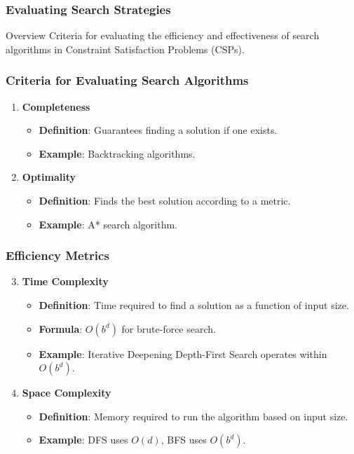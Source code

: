 \documentclass[aspectratio=169]{beamer}
\begin{document}
\begin{frame}[fragile]
    \frametitle{Evaluating Search Strategies}
    \begin{block}{Overview}
    Criteria for evaluating the efficiency and effectiveness of search algorithms in Constraint Satisfaction Problems (CSPs).
    \end{block}
\end{frame}

\begin{frame}[fragile]
    \frametitle{Criteria for Evaluating Search Algorithms}
    \begin{enumerate}
        \item \textbf{Completeness}
            \begin{itemize}
                \item \textbf{Definition}: Guarantees finding a solution if one exists.
                \item \textbf{Example}: Backtracking algorithms.
            \end{itemize}
        \item \textbf{Optimality}
            \begin{itemize}
                \item \textbf{Definition}: Finds the best solution according to a metric.
                \item \textbf{Example}: A* search algorithm.
            \end{itemize}
    \end{enumerate}
\end{frame}

\begin{frame}[fragile]
    \frametitle{Efficiency Metrics}
    \begin{enumerate}
        \setcounter{enumi}{2} %
        \item \textbf{Time Complexity}
            \begin{itemize}
                \item \textbf{Definition}: Time required to find a solution as a function of input size.
                \item \textbf{Formula}: \(O(b^d)\) for brute-force search.
                \item \textbf{Example}: Iterative Deepening Depth-First Search operates within \(O(b^d)\).
            \end{itemize}
        \item \textbf{Space Complexity}
            \begin{itemize}
                \item \textbf{Definition}: Memory required to run the algorithm based on input size.
                \item \textbf{Example}: DFS uses \(O(d)\), BFS uses \(O(b^d)\).
            \end{itemize}
    \end{enumerate}
\end{frame}
\end{document}
